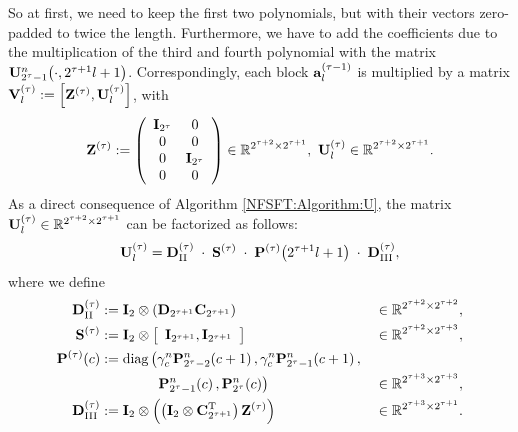 So at first, we need to keep the first two polynomials, but with their vectors zero-padded to twice the length. Furthermore, we have to add 
the coefficients due to the multiplication of the third and fourth polynomial with the matrix $\mathbf{U}_{2^{\tau}-1}^{n}{\hspace{-0.4ex}}\left(\cdot,2^{\tau+1}l+1\right)$.
Correspondingly, each block $\mathbf{a}_{l}^{(\tau-1)}$ is multiplied by a matrix $\mathbf{V}^{(\tau)}_l := \left[\mathbf{Z^{(\tau)}},\mathbf{U}^{(\tau)}_l\right]$, with
\[\V{Z}^{(\tau)} := \left(\begin{array}{cccc} \V{I}_{2^{\tau}} & 0\\ 0 & 0 \\ 0 & \V{I}_{2^{\tau}} \\ 0 & 0 \end{array}\right) \in \R^{2^{\tau+2} \times 2^{\tau+1}},\ \V{U}^{(\tau)}_l \in \R^{2^{\tau+2} \times 2^{\tau+1}}.\]
As a direct consequence of Algorithm \ref{NFSFT:Algorithm:U}, the matrix $\mathbf{U}^{(\tau)}_l \in \mathbb{R}^{2^{\tau+2} \times 2^{\tau+1}}$ can be factorized as follows:
\begin{equation} 
  \label{NFSFT:LinearAlgebra:Factorization}
  \mathbf{U}^{(\tau)}_l = \mathbf{D}^{(\tau)}_{\text{II}} \; \cdot \; \mathbf{S}^{(\tau)} \; \cdot \; \mathbf{P}^{(\tau)}{\hspace{-0.4ex}}\left(2^{\tau + 1}l+1\right) \; \cdot \; \mathbf{D}^{(\tau)}_{\text{III}},
\end{equation}
where we define
\begin{align*}
  \mathbf{D}^{(\tau)}_{\text{II}} & := \mathbf{I}_{2} \otimes \left(\mathbf{D}_{2^{\tau+1}} \mathbf{C}_{2^{\tau+1}}\right) & \in \mathbb{R}^{2^{\tau+2} \times 2^{\tau+2}},\\
  \mathbf{S}^{(\tau)} & := \mathbf{I}_2 \otimes \left[\begin{array}{cc}\mathbf{I}_{2^{\tau+1}},\mathbf{I}_{2^{\tau+1}}\end{array}\right] & \in \mathbb{R}^{2^{\tau+2} \times 2^{\tau+3}},\\
  \mathbf{P}^{(\tau)}{\hspace{-0.4ex}}\left(c\right) & := \text{diag}\left(\gamma_{c}^n \mathbf{P}_{2^{\tau}-2}^n{\hspace{-0.4ex}}\left(c+1\right),\gamma_{c}^n \mathbf{P}_{2^{\tau}-1}^n{\hspace{-0.4ex}}\left(c+1\right),\right.\\
    & \left. \hspace{9ex} \mathbf{P}_{2^{\tau}-1}^n{\hspace{-0.4ex}}\left(c\right), \mathbf{P}_{2^{\tau}}^n{\hspace{-0.4ex}}\left(c\right)\right) & \in \mathbb{R}^{2^{\tau+3} \times 2^{\tau+3}},\\
  \mathbf{D}^{(\tau)}_{\text{III}} & := \mathbf{I}_{2} \otimes \left(\left(\mathbf{I}_{2} \otimes \mathbf{C}^{\text{\rm{T}}}_{2^{\tau+1}}\right)\mathbf{Z}^{(\tau)}\right) & \in \mathbb{R}^{2^{\tau+3} \times 2^{\tau+1}}.
\end{align*}   
